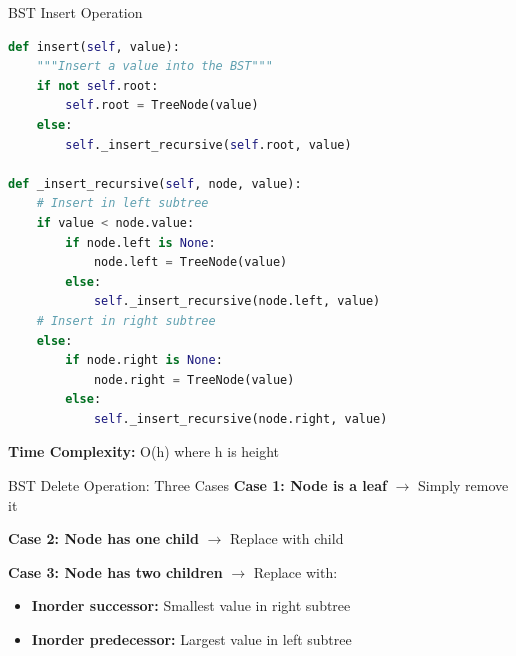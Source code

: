 \documentclass[aspectratio=169]{beamer}
\begin{document}
\begin{frame}[fragile]{BST Insert Operation}
  \begin{lstlisting}[language=Python, basicstyle=\ttfamily\small]
def insert(self, value):
    """Insert a value into the BST"""
    if not self.root:
        self.root = TreeNode(value)
    else:
        self._insert_recursive(self.root, value)

def _insert_recursive(self, node, value):
    # Insert in left subtree
    if value < node.value:
        if node.left is None:
            node.left = TreeNode(value)
        else:
            self._insert_recursive(node.left, value)
    # Insert in right subtree
    else:
        if node.right is None:
            node.right = TreeNode(value)
        else:
            self._insert_recursive(node.right, value)
  \end{lstlisting}

  \vspace{0.3cm}
  \textbf{Time Complexity:} O(h) where h is height
\end{frame}

\begin{frame}{BST Delete Operation: Three Cases}
  \textbf{Case 1: Node is a leaf} $\rightarrow$ Simply remove it

  \textbf{Case 2: Node has one child} $\rightarrow$ Replace with child

  \textbf{Case 3: Node has two children} $\rightarrow$ Replace with:
  \begin{itemize}
    \item \textbf{Inorder successor:} Smallest value in right subtree
    \item \textbf{Inorder predecessor:} Largest value in left subtree
  \end{itemize}

  \vspace{0.3cm}
  \begin{center}
  \end{center}
\end{frame}
\end{document}
